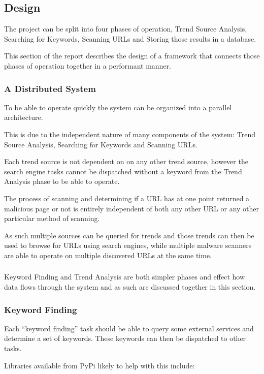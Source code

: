 \subsection{Design}
The project can be split into four phases of operation, Trend Source Analysis, Searching for Keywords, Scanning URLs and Storing those results in a database.

This section of the report describes the design of a framework that connects those phases of operation together in a performant manner.

\subsubsection{A Distributed System}
To be able to operate quickly the system can be organized into a parallel architecture.

This is due to the independent nature of many components of the system: Trend Source Analysis, Searching for Keywords and Scanning URLs.

Each trend source is not dependent on on any other trend source, however the search engine tasks cannot be dispatched without a keyword from the Trend Analysis phase to be able to operate.

The process of scanning and determining if a URL has at one point returned a malicious page or not is entirely independent of both any other URL or any other particular method of scanning.

As such multiple sources can be queried for trends and those trends can then be used to browse for URLs using search engines, while multiple malware scanners are able to operate on multiple discovered URLs at the same time.

\subsubsection{}

Keyword Finding and Trend Analysis are both simpler phases and effect how data flows through the system and as such are discussed together in this section.

\subsubsection{Keyword Finding}
Each ``keyword finding'' task should be able to query some external services and determine a set of keywords. These keywords can then be dispatched to other tasks.

Libraries available from PyPi likely to help with this include:


